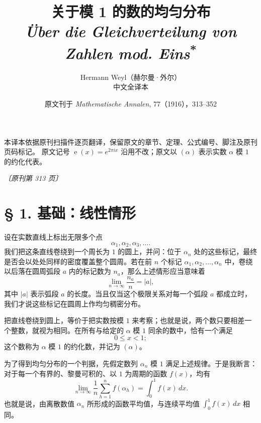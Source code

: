 \documentclass[UTF8,11pt,a4paper,fontset=none]{ctexart}
\title{\bfseries 关于模 1 的数的均匀分布\\[0.35em]
\large \textit{Über die Gleichverteilung von Zahlen mod. Eins}\textsuperscript{*}}
\author{Hermann Weyl（赫尔曼·外尔）\\[0.3em]\normalsize 中文全译本}
\date{原文刊于 \textit{Mathematische Annalen}, 77（1916），313--352}
\theoremstyle{weylthm}
\newcommand{\e}{\operatorname{e}}
\newcommand{\origpage}[1]{%
  \par\vspace{0.7em}\noindent\hfill{\small\itshape〔原刊第 #1 页〕}\par\vspace{0.25em}}
\begin{document}
\maketitle
\thispagestyle{plain}
\begingroup
\renewcommand{\thefootnote}{*}
\endgroup

\begin{center}
\small
本译本依据原刊扫描件逐页翻译，保留原文的章节、定理、公式编号、脚注及原刊页码标记。
原文记号 \(\e(x)=e^{2\pi i x}\) 沿用不改；原文以 \((\alpha)\) 表示实数 \(\alpha\) 模 \(1\) 的约化代表。
\end{center}
\vspace{0.8em}

\tableofcontents
\clearpage

\origpage{313}

\section*{§ 1. 基础：线性情形}

设在实数直线上标出无限多个点
\[
  \alpha_1,\alpha_2,\alpha_3,\ldots.
\]
我们把这条直线卷绕到一个周长为 \(1\) 的圆上，并问：位于 \(\alpha_n\) 处的这些标记，最终是否会以处处同样的密度覆盖整个圆周。若在前 \(n\) 个标记
\(
\alpha_1,\alpha_2,\ldots,\alpha_n
\)
中，卷绕以后落在圆周弧段 \(a\) 内的标记数为 \(n_a\)，那么上述情形应当意味着
\begin{equation}
  \lim_{n\to\infty}\frac{n_a}{n}=|a|,
  \tag{1}
\end{equation}
其中 \(|a|\) 表示弧段 \(a\) 的长度。当且仅当这个极限关系对每一个弧段 \(a\) 都成立时，我们才说这些标记在圆周上作均匀稠密分布。

把直线卷绕到圆上，等价于把实数按模 \(1\) 来考察；也就是说，两个数只要相差一个整数，就视为相同。在所有与给定的 \(\alpha\) 模 \(1\) 同余的数中，恰有一个满足
\[
  0\leq x<1;
\]
这个数称为 \(\alpha\) 模 \(1\) 的约化数，并记为 \((\alpha)\)。

为了得到均匀分布的一个判据，先假定数列 \(\alpha_n\) 模 \(1\) 满足上述规律。于是我断言：对于每一个有界的、黎曼可积的、以 \(1\) 为周期的函数 \(f(x)\)，均有
\begin{equation}
  \lim_{n\to\infty}\frac1n\sum_{h=1}^{n}f(\alpha_h)
  =\int_0^1 f(x)\,dx.
  \tag{2}
\end{equation}
也就是说，由离散数值 \(\alpha_n\) 所形成的函数平均值，与连续平均值
\(\int_0^1f(x)\,dx\) 相同。
\end{document}
